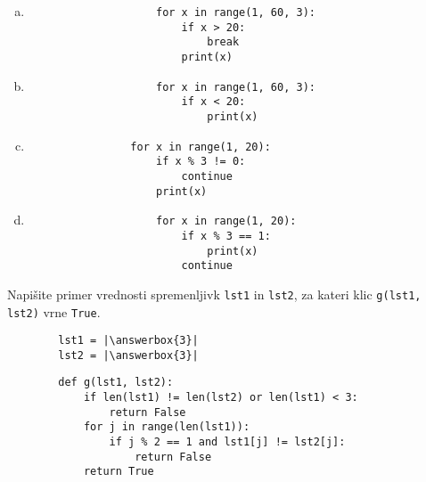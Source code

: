 \documentclass[arhiv, 10pt]{../izpit}
\newcommand{\inlinepy}[1]{\texttt{#1}}
\newcommand{\answerbox}[1]{\framebox{\vphantom{\large M}\hspace{#1cm}}}
\begin{document}
        \begin{multicols}{2}
        \begin{enumerate}[(a)]
\item 
                \begin{verbatim}
                    for x in range(1, 60, 3):
                        if x > 20:
                            break
                        print(x)
                \end{verbatim}
            
\item 
                \begin{verbatim}
                    for x in range(1, 60, 3):
                        if x < 20:
                            print(x)
                \end{verbatim}
            
\item 
            \begin{verbatim}
                for x in range(1, 20):
                    if x % 3 != 0:
                        continue
                    print(x)
            \end{verbatim}
        
\item 
                \begin{verbatim}
                    for x in range(1, 20):
                        if x % 3 == 1:
                            print(x)
                        continue
                \end{verbatim}
            
\end{enumerate}

        \end{multicols}
    
        \naloga*
        \begin{multicols}{2}
        \noindent
        Napišite primer vrednosti spremenljivk \inlinepy{lst1} in \inlinepy{lst2}, za kateri klic \inlinepy{g(lst1, lst2)} vrne \inlinepy{True}.
        \begin{verbatim}
        lst1 = |\answerbox{3}|
        lst2 = |\answerbox{3}|
        \end{verbatim}
        \vfil
        \columnbreak
        \begin{verbatim}
        def g(lst1, lst2):
            if len(lst1) != len(lst2) or len(lst1) < 3:
                return False
            for j in range(len(lst1)):
                if j % 2 == 1 and lst1[j] != lst2[j]:
                    return False
            return True
        \end{verbatim}
        \end{multicols}
    
\end{document}
